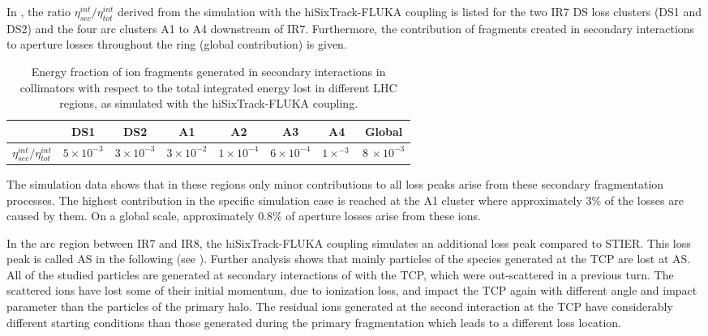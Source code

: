 \newpage
In , the ratio $\eta_{sec}^{int}/\eta^{int}_{tot}$ derived from the simulation with the hiSixTrack-FLUKA coupling is listed for the two IR7 DS loss clusters (DS1 and DS2) and the four arc clusters A1 to A4 downstream of IR7. Furthermore, the contribution of fragments created in secondary interactions to aperture losses throughout the ring (global contribution) is given.
%
\begin{table}[t]
\centering
\caption{Energy fraction of ion fragments generated in secondary interactions in collimators with respect to the total integrated energy lost in different LHC regions, as simulated with the hiSixTrack-FLUKA coupling. }
\label{tab:secondary}
\begin{tabular}{cccccccc}
                                \toprule                                             & DS1              & DS2              & A1                 & A2                & A3                & A4              & Global \\ \midrule
$\eta_{sec}^{int}/\eta^{int}_{tot}$& $5\times 10^{-3}$ & $3\times 10^{-3}$ & $3\times 10^{-2}$ & $1 \times 10^{-4}$ & $6 \times 10^{-4}$ & $1\times^{-3}$ & $8\,\times10^{-3}$  \\ \bottomrule
\end{tabular}
\end{table}
%

The simulation data shows that in these regions only minor contributions to all loss peaks arise from these secondary fragmentation processes. The highest contribution in the specific simulation case is reached at the A1 cluster where approximately 3\% of the losses are caused by them. On a global scale, approximately 0.8\% of aperture losses arise from these ions. 

In the arc region between IR7 and IR8, the hiSixTrack-FLUKA coupling simulates an additional loss peak compared to STIER. This loss peak is called AS in the following (see ). Further analysis shows that mainly particles of the species  generated at the TCP are lost at AS. All of the studied particles are generated at secondary interactions of \lead with the TCP, which were out-scattered in a previous turn. The scattered \lead ions have lost some of their initial momentum, due to ionization loss, and impact the TCP again with different angle and impact parameter than the particles of the primary halo. The residual  ions generated at the second interaction at the TCP have considerably different starting conditions than those generated during the primary fragmentation which leads to a different loss location. 

